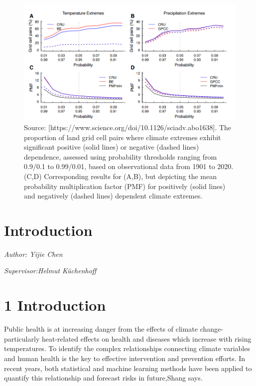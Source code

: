 \documentclass[
]{krantz}
\begin{document}
\vspace{1em}
\begin{figure}

{\centering \includegraphics[width=0.8\linewidth]{work/06-anthropo/figures/sensitivity} 

}

\caption{Source: [https://www.science.org/doi/10.1126/sciadv.abo1638]. The proportion of land grid cell pairs where climate extremes exhibit significant positive (solid lines) or negative (dashed lines) dependence, assessed using probability thresholds ranging from 0.9/0.1 to 0.99/0.01, based on observational data from 1901 to 2020. (C,D) Corresponding results for (A,B), but depicting the mean probability multiplication factor (PMF) for positively (solid lines) and negatively (dashed lines) dependent climate extremes.}\label{fig:unnamed-chunk-10}
\end{figure}
\vspace{1em}

\chapter{Introduction}\label{introduction-3}

\emph{Author: Yijie Chen}

\emph{Supervisor:Helmut Küchenhoff}

\chapter{1 Introduction}\label{introduction-4}

Public health is at increasing danger from the effects of climate change-particularly heat-related effects on health and diseases which increase with rising temperatures. To identify the complex relationships connecting climate variables and human health is the key to effective intervention and prevention efforts. In recent years, both statistical and machine learning methods have been applied to quantify this relationship and forecast risks in future,Shang says.
\end{document}
